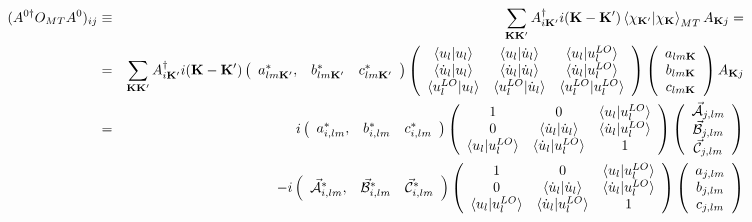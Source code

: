 \documentclass[aps,prb,floatfix,epsfig,singlecolumn,showpacs,preprintnumbers]{revtex4}
\newcommand{\vK}{{\mathbf{K}}}
\newcommand{\vcA}{\vec{\cal A}}
\newcommand{\vcB}{\vec{\cal B}}
\newcommand{\vcC}{\vec{\cal C}}
\begin{document}
\begin{eqnarray}
(A^{0\dagger} O_{MT} A^0)_{ij} &\equiv& \sum_{\vK\vK'} A^\dagger_{i\vK'} i(\vK-\vK')\braket{\chi_{\vK'}|\chi_\vK}_{MT}A_{\vK j}=
\\
&=&
\sum_{\vK\vK'} A^\dagger_{i\vK'} i(\vK-\vK')
\left(
\begin{array}{ccc}
a_{lm\vK'}^*, & b_{lm\vK'}^* & c^*_{lm\vK'}
\end{array}
\right)
\left(
\begin{array}{ccc}
{\braket{u_l|u_l}} & {\braket{u_l|\dot{u}_l}} & {\braket{u_l|u^{LO}_l}} \\
{\braket{\dot{u}_l|u_l}} & {\braket{\dot{u}_l|\dot{u}_l}} & {\braket{\dot{u}_l|u^{LO}_l}} \\
{\braket{u^{LO}_l|u_l}} & {\braket{u^{LO}_l|\dot{u}_l}} & {\braket{u^{LO}_l|u^{LO}_l}} 
\end{array}
\right)
\left(
\begin{array}{c}
a_{lm\vK}\\
b_{lm\vK}\\ 
c_{lm\vK}
\end{array}
\right) A_{\vK j}
\nonumber\\
&=&
i\left(
\begin{array}{ccc}
a_{i,lm}^*, & b_{i,lm}^* & c^*_{i,lm}
\end{array}
\right)
\left(
\begin{array}{ccc}
1 & 0 & \braket{u_l|u^{LO}_l} \\
0 & \braket{\dot{u}_l|\dot{u}_l} & \braket{\dot{u}_l|u^{LO}_l} \\
\braket{u_l|u^{LO}_l} & \braket{\dot{u}_l|u^{LO}_l} & 1 
\end{array}
\right)
\left(
\begin{array}{c}
\vcA_{j,lm}\\
\vcB_{j,lm}\\ 
\vcC_{j,lm}
\end{array}
\right) 
\\
&& -i
\left(
\begin{array}{ccc}
\vcA^*_{i,lm}, & \vcB^*_{i,lm} & \vcC^*_{i,lm}
\end{array}
\right)
\left(
\begin{array}{ccc}
1 & 0 & \braket{u_l|u^{LO}_l} \\
0 & \braket{\dot{u}_l|\dot{u}_l} & \braket{\dot{u}_l|u^{LO}_l} \\
\braket{u_l|u^{LO}_l} & \braket{\dot{u}_l|u^{LO}_l} & 1 
\end{array}
\right)
\left(
\begin{array}{c}
a_{j,lm}\\
b_{j,lm}\\ 
c_{j,lm}
\end{array}
\right) 
\nonumber
\end{eqnarray}
\end{document}
